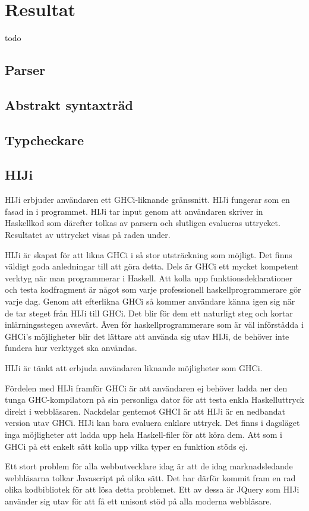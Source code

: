 \section{Resultat}
todo

\subsection{Parser} 

\subsection{Abstrakt syntaxträd} 

\subsection{Typcheckare} 


\subsection{HIJi}


HIJi erbjuder användaren ett GHCi-liknande gränssnitt. HIJi fungerar som en fasad in i programmet. 
HIJi tar input genom att användaren skriver in Haskellkod som därefter tolkas av parsern och slutligen evalueras uttrycket. Resultatet av uttrycket visas på raden under.

HIJi är skapat för att likna GHCi i så stor utsträckning som möjligt. Det finns väldigt goda anledningar till att göra detta. Dels är GHCi ett mycket kompetent verktyg när man programmerar i Haskell. Att kolla upp funktionsdeklarationer och testa kodfragment är något som varje professionell haskellprogrammerare gör varje dag. Genom att efterlikna GHCi så kommer användare känna igen sig när de tar steget från HIJi till GHCi. Det blir för dem ett naturligt steg och kortar inlärningsstegen avsevärt. Även för haskellprogrammerare som är väl införstådda i GHCi's möjligheter blir det lättare att använda sig utav HIJi, de behöver inte fundera hur verktyget ska användas.




HIJi är tänkt att erbjuda användaren liknande möjligheter som GHCi. 

Fördelen med HIJi framför GHCi är att användaren ej behöver ladda ner den tunga GHC-kompilatorn på sin personliga dator för att testa enkla Haskelluttryck direkt i webbläsaren.
Nackdelar gentemot GHCI är att HIJi är en nedbandat version utav GHCi. HIJi kan bara evaluera enklare uttryck. Det finns i dagsläget inga möjligheter att ladda upp hela Haskell-filer för att köra dem. Att som i GHCi på ett enkelt sätt kolla upp vilka typer en funktion stöds ej.

Ett stort problem för alla webbutvecklare idag är att de idag marknadsledande webbläsarna tolkar Javascript på olika sätt. Det har därför kommit fram en rad olika kodbibliotek för att lösa detta problemet. Ett av dessa är JQuery som HIJi använder sig utav för att få ett unisont stöd på alla moderna webbläsare. 


